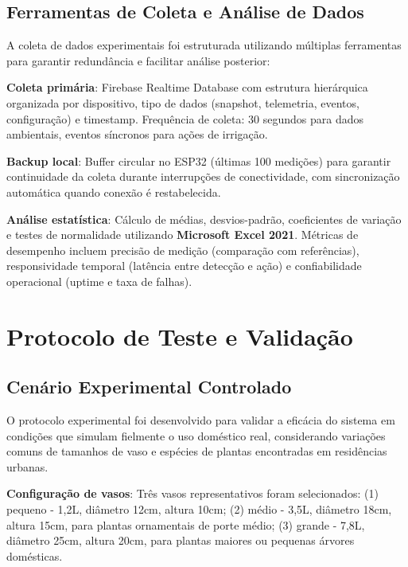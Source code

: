 \subsection{Ferramentas de Coleta e Análise de Dados}

A coleta de dados experimentais foi estruturada utilizando múltiplas ferramentas para garantir redundância e facilitar análise posterior:

\textbf{Coleta primária}: Firebase Realtime Database com estrutura hierárquica organizada por dispositivo, tipo de dados (snapshot, telemetria, eventos, configuração) e timestamp. Frequência de coleta: 30 segundos para dados ambientais, eventos síncronos para ações de irrigação.

\textbf{Backup local}: Buffer circular no ESP32 (últimas 100 medições) para garantir continuidade da coleta durante interrupções de conectividade, com sincronização automática quando conexão é restabelecida.

\textbf{Análise estatística}: Cálculo de médias, desvios-padrão, coeficientes de variação e testes de normalidade utilizando \textbf{Microsoft Excel 2021}. Métricas de desempenho incluem precisão de medição (comparação com referências), responsividade temporal (latência entre detecção e ação) e confiabilidade operacional (uptime e taxa de falhas).

\section{Protocolo de Teste e Validação}

\subsection{Cenário Experimental Controlado}

O protocolo experimental foi desenvolvido para validar a eficácia do sistema em condições que simulam fielmente o uso doméstico real, considerando variações comuns de tamanhos de vaso e espécies de plantas encontradas em residências urbanas.

\textbf{Configuração de vasos}: Três vasos representativos foram selecionados: (1) pequeno - 1,2L, diâmetro 12cm, altura 10cm; (2) médio - 3,5L, diâmetro 18cm, altura 15cm, para plantas ornamentais de porte médio; (3) grande - 7,8L, diâmetro 25cm, altura 20cm, para plantas maiores ou pequenas árvores domésticas.

